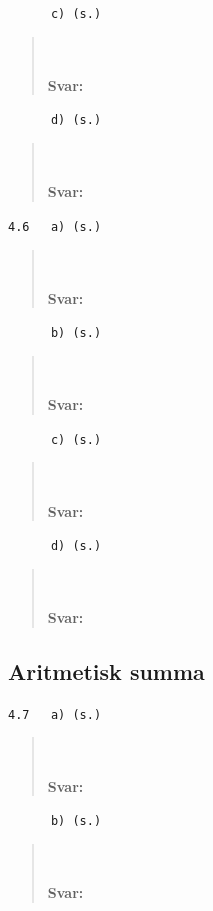 \documentclass[a4paper]{article}
\newcommand{\tskcol}[1]{\textcolor{tskcol}{#1}}
\begin{document}
	\texttt{\tskcol{~~~~~~c) (s.)}}
	\begin{quotation}
		\noindent
		\\ \\
		\textbf{Svar:} 
	\end{quotation}
	
	\texttt{\tskcol{~~~~~~d) (s.)}}
	\begin{quotation}
		\noindent
		\\ \\
		\textbf{Svar:} 
	\end{quotation}
	
	\texttt{\tskcol{4.6~~~a) (s.)}}
	\begin{quotation}
		\noindent
		\\ \\
		\textbf{Svar:} 
	\end{quotation}
	
	\texttt{\tskcol{~~~~~~b) (s.)}}
	\begin{quotation}
		\noindent
		\\ \\
		\textbf{Svar:} 
	\end{quotation}
	
	\texttt{\tskcol{~~~~~~c) (s.)}}
	\begin{quotation}
		\noindent
		\\ \\
		\textbf{Svar:} 
	\end{quotation}
	
	\texttt{\tskcol{~~~~~~d) (s.)}}
	\begin{quotation}
		\noindent
		\\ \\
		\textbf{Svar:} 
	\end{quotation}
	
	\subsection*{Aritmetisk summa}
	
	\texttt{\tskcol{4.7~~~a) (s.)}}
	\begin{quotation}
		\noindent
		\\ \\
		\textbf{Svar:} 
	\end{quotation}
	
	\texttt{\tskcol{~~~~~~b) (s.)}}
	\begin{quotation}
		\noindent
		\\ \\
		\textbf{Svar:} 
	\end{quotation}
	
\end{document}
